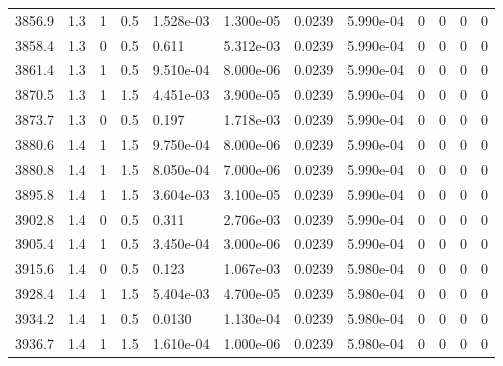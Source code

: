 \documentclass[preview]{standalone}
\begin{document}
{{{{{{{{{{{{{{{\begin{tabular}{L{1.2cm}C{1.2cm} C{0.3cm}C{0.5cm} C{1.4cm}C{1.4cm} C{1.4cm}C{1.4cm} C{1.6cm}C{1.6cm} C{1.6cm}C{1.6cm}}
  3856.9  &   1.3  & 1     & 0.5 &  1.528e-03  & 1.300e-05  &  0.0239&   5.990e-04& 0 & 0   &  0 & 0  \\ 
  3858.4  &   1.3  & 0     & 0.5 &  0.611  & 5.312e-03  &  0.0239&   5.990e-04& 0 & 0   &  0 & 0  \\ 
  3861.4  &   1.3  & 1     & 0.5 &  9.510e-04  & 8.000e-06  &  0.0239&   5.990e-04& 0 & 0   &  0 & 0  \\ 
  3870.5  &   1.3  & 1     & 1.5 &  4.451e-03  & 3.900e-05  &  0.0239&   5.990e-04& 0 & 0   &  0 & 0  \\ 
  3873.7  &   1.3  & 0     & 0.5 &  0.197  & 1.718e-03  &  0.0239&   5.990e-04& 0 & 0   &  0 & 0  \\ 
  3880.6  &   1.4  & 1     & 1.5 &  9.750e-04  & 8.000e-06  &  0.0239&   5.990e-04& 0 & 0   &  0 & 0  \\ 
  3880.8  &   1.4  & 1     & 1.5 &  8.050e-04  & 7.000e-06  &  0.0239&   5.990e-04& 0 & 0   &  0 & 0  \\ 
  3895.8  &   1.4  & 1     & 1.5 &  3.604e-03  & 3.100e-05  &  0.0239&   5.990e-04& 0 & 0   &  0 & 0  \\ 
  3902.8  &   1.4  & 0     & 0.5 &  0.311  & 2.706e-03  &  0.0239&   5.990e-04& 0 & 0   &  0 & 0  \\ 
  3905.4  &   1.4  & 1     & 0.5 &  3.450e-04  & 3.000e-06  &  0.0239&   5.990e-04& 0 & 0   &  0 & 0  \\ 
  3915.6  &   1.4  & 0     & 0.5 &  0.123  & 1.067e-03  &  0.0239&   5.980e-04& 0 & 0   &  0 & 0  \\ 
  3928.4  &   1.4  & 1     & 1.5 &  5.404e-03  & 4.700e-05  &  0.0239&   5.980e-04& 0 & 0   &  0 & 0  \\ 
  3934.2  &   1.4  & 1     & 0.5 &  0.0130  & 1.130e-04  &  0.0239&   5.980e-04& 0 & 0   &  0 & 0  \\ 
  3936.7  &   1.4  & 1     & 1.5 &  1.610e-04  & 1.000e-06  &  0.0239&   5.980e-04& 0 & 0   &  0 & 0  \\ 
\hline 
\end{tabular} 

}}}}}}}}}}}}}}}
\end{document}
